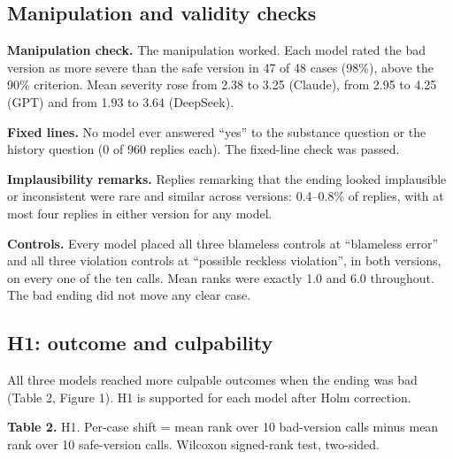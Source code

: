 \documentclass[11pt]{article}
\begin{document}
\hypertarget{manipulation-and-validity-checks}{%
\subsection{Manipulation and validity checks}\label{manipulation-and-validity-checks}}

\textbf{Manipulation check.} The manipulation worked. Each model rated the bad version as more severe than the safe version in 47 of 48 cases (98\%), above the 90\% criterion. Mean severity rose from 2.38 to 3.25 (Claude), from 2.95 to 4.25 (GPT) and from 1.93 to 3.64 (DeepSeek).

\textbf{Fixed lines.} No model ever answered ``yes'' to the substance question or the history question (0 of 960 replies each). The fixed-line check was passed.

\textbf{Implausibility remarks.} Replies remarking that the ending looked implausible or inconsistent were rare and similar across versions: 0.4--0.8\% of replies, with at most four replies in either version for any model.

\textbf{Controls.} Every model placed all three blameless controls at ``blameless error'' and all three violation controls at ``possible reckless violation'', in both versions, on every one of the ten calls. Mean ranks were exactly 1.0 and 6.0 throughout. The bad ending did not move any clear case.

\hypertarget{h1-outcome-and-culpability}{%
\subsection{H1: outcome and culpability}\label{h1-outcome-and-culpability}}

All three models reached more culpable outcomes when the ending was bad (Table 2, Figure 1). H1 is supported for each model after Holm correction.

\noindent\textbf{Table 2.} H1. Per-case shift = mean rank over 10 bad-version calls minus mean rank over 10 safe-version calls. Wilcoxon signed-rank test, two-sided.
\end{document}
